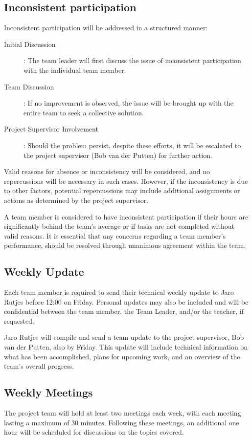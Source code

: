 \documentclass{projdoc}
\begin{document}
\subsection{Inconsistent participation}
Inconsistent participation will be addressed in a structured manner:
\begin{description}
	\item[Initial Discussion]: The team leader will first discuss the 
	issue of inconsistent participation with the individual team member.
	\item [Team Discussion]: If no improvement is observed, the issue 
	will be brought up with the entire team to seek a collective solution.
	\item [Project Supervisor Involvement]: Should the problem persist, despite these efforts, it will be escalated to the project supervisor (Bob van der Putten) for further action.
\end{description}

Valid reasons for absence or inconsistency will be considered, and no 
repercussions will be necessary in such cases. However, if the inconsistency is 
due to other factors, potential repercussions may include additional assignments or actions as determined by the project supervisor.

A team member is considered to have inconsistent participation if their hours 
are significantly behind the team’s average or if tasks are not completed 
without valid reasons. It is essential that any concerns regarding a team 
member's performance, should be resolved through unanimous agreement within the team.

\subsection{Weekly Update}
Each team member is required to send their technical weekly update to Jaro 
Rutjes before 12:00 on Friday. Personal updates may also be included and will be confidential between the team member, the Team Leader, and/or the teacher, if requested.

Jaro Rutjes will compile and send a team update to the project supervisor, Bob 
van der Putten, also by Friday. This update will include technical information 
on what has been accomplished, plans for upcoming work, and an overview of the 
team's overall progress.

\subsection{Weekly Meetings}
The project team will hold at least two meetings each week, with each meeting 
lasting a maximum of 30 minutes. Following these meetings, an additional one 
hour will be scheduled for discussions on the topics covered.
\end{document}

